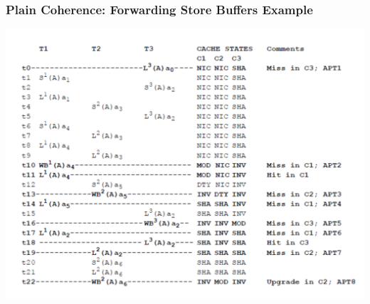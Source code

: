 \documentclass{beamer}
\begin{document}
\begin{frame}[fragile,t]
\frametitle{Plain Coherence: Forwarding Store Buffers Example}
\vspace{-3ex}

{\center \includegraphics[width=65ex]{Ch7Figs/FwdStoreBuffEG1}}

\end{frame}
\end{document}
